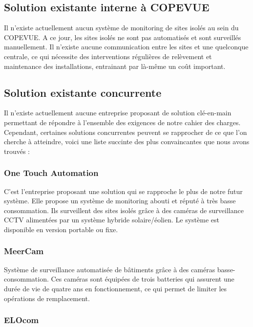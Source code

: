 \subsection{Solution existante interne à COPEVUE}

Il n'existe actuellement aucun système de monitoring de sites isolés au sein du COPEVUE. A ce jour, les sites isolés ne sont pas automatisés et sont surveillés manuellement. Il n'existe aucune communication entre les sites et une quelconque centrale, ce qui nécessite des interventions régulières de relèvement et maintenance des installations, entrainant par là-même un coût important.

\subsection{Solution existante concurrente}

Il n'existe actuellement aucune entreprise proposant de solution clé-en-main permettant de répondre à l'ensemble des exigences de notre cahier des charges. Cependant, certaines solutions concurrentes peuvent se rapprocher de ce que l'on cherche à atteindre, voici une liste succinte des plus convaincantes que nous avons trouvés :

\subsubsection{One Touch Automation}

C'est l'entreprise proposant une solution qui se rapproche le plus de notre futur système.
Elle propose un système de monitoring abouti et réputé à très basse consommation. Ils surveillent des sites isolés grâce à des caméras de surveillance CCTV alimentées par un système hybride solaire/éolien. Le système est disponible en version portable ou fixe.

\subsubsection{MeerCam}

Système de surveillance automatisée de bâtiments grâce à des caméras basse-consommation. Ces caméras sont équipées de trois batteries qui assurent une durée de vie de quatre ans en fonctionnement, ce qui permet de limiter les opérations de remplacement.

\subsubsection{ELOcom}


